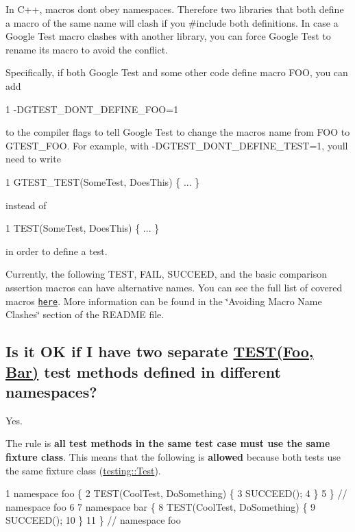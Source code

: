 In C++, macros don\textquotesingle{}t obey namespaces. Therefore two libraries that both define a macro of the same name will clash if you {\ttfamily \#include} both definitions. In case a Google Test macro clashes with another library, you can force Google Test to rename its macro to avoid the conflict.

Specifically, if both Google Test and some other code define macro {\ttfamily F\+OO}, you can add 
\begin{DoxyCode}
1 -DGTEST\_DONT\_DEFINE\_FOO=1
\end{DoxyCode}
 to the compiler flags to tell Google Test to change the macro\textquotesingle{}s name from {\ttfamily F\+OO} to {\ttfamily G\+T\+E\+S\+T\+\_\+\+F\+OO}. For example, with {\ttfamily -\/\+D\+G\+T\+E\+S\+T\+\_\+\+D\+O\+N\+T\+\_\+\+D\+E\+F\+I\+N\+E\+\_\+\+T\+E\+ST=1}, you\textquotesingle{}ll need to write 
\begin{DoxyCode}
1 GTEST\_TEST(SomeTest, DoesThis) \{ ... \}
\end{DoxyCode}
 instead of 
\begin{DoxyCode}
1 TEST(SomeTest, DoesThis) \{ ... \}
\end{DoxyCode}
 in order to define a test.

Currently, the following {\ttfamily T\+E\+ST}, {\ttfamily F\+A\+IL}, {\ttfamily S\+U\+C\+C\+E\+ED}, and the basic comparison assertion macros can have alternative names. You can see the full list of covered macros \href{http://www.google.com/codesearch?q=if+!GTEST_DONT_DEFINE_\w%2B+package:http://googletest\.googlecode\.com+file:/include/gtest/gtest.h}{\tt here}. More information can be found in the \char`\"{}\+Avoiding Macro Name Clashes\char`\"{} section of the R\+E\+A\+D\+ME file.

\subsection*{Is it OK if I have two separate {\ttfamily \hyperlink{gtest_8h_ad8b332753515c0ab8baada563c2547eb}{T\+E\+S\+T(\+Foo, Bar)}} test methods defined in different namespaces?}

Yes.

The rule is {\bfseries all test methods in the same test case must use the same fixture class}. This means that the following is {\bfseries allowed} because both tests use the same fixture class ({\ttfamily \hyperlink{classtesting_1_1_test}{testing\+::\+Test}}).


\begin{DoxyCode}
1 namespace foo \{
2 TEST(CoolTest, DoSomething) \{
3   SUCCEED();
4 \}
5 \}  // namespace foo
6 
7 namespace bar \{
8 TEST(CoolTest, DoSomething) \{
9   SUCCEED();
10 \}
11 \}  // namespace foo
\end{DoxyCode}


